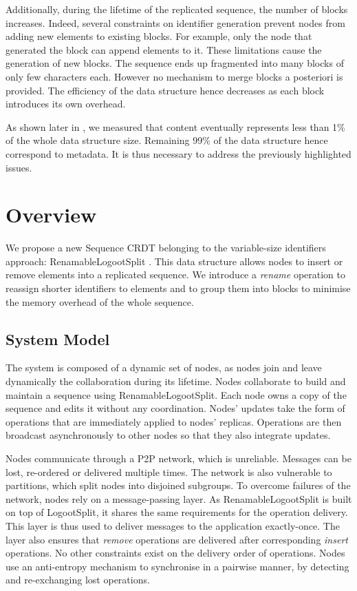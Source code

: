 \documentclass[10pt,journal,compsoc]{IEEEtran}
\begin{document}
Additionally, during the lifetime of the replicated sequence, the number of blocks increases.
Indeed, several constraints on identifier generation prevent nodes from adding new elements to existing blocks.
For example, only the node that generated the block can append elements to it.
These limitations cause the generation of new blocks.
The sequence ends up fragmented into many blocks of only few characters each.
However no mechanism to merge blocks a posteriori is provided.
The efficiency of the data structure hence decreases as each block introduces its own overhead.

As shown later in , we measured that content eventually represents less than 1\% of the whole data structure size.
Remaining 99\% of the data structure hence correspond to metadata.
It is thus necessary to address the previously highlighted issues.

\section{Overview}
\label{sec:overview}

We propose a new Sequence \ac{CRDT} belonging to the variable-size identifiers approach: RenamableLogootSplit \cite{nicolas:hal-01932552,nicolas:hal-02526724}.
This data structure allows nodes to insert or remove elements into a replicated sequence.
We introduce a \emph{rename} operation to reassign shorter identifiers to elements and to group them into blocks to minimise the memory overhead of the whole sequence.

\subsection{System Model}

The system is composed of a dynamic set of nodes, as nodes join and leave dynamically the collaboration during its lifetime.
Nodes collaborate to build and maintain a sequence using RenamableLogootSplit.
Each node owns a copy of the sequence and edits it without any coordination.
Nodes' updates take the form of operations that are immediately applied to nodes' replicas.
Operations are then broadcast asynchronously to other nodes so that they also integrate updates.

Nodes communicate through a \ac{P2P} network, which is unreliable.
Messages can be lost, re-ordered or delivered multiple times.
The network is also vulnerable to partitions, which split nodes into disjoined subgroups.
To overcome failures of the network, nodes rely on a message-passing layer.
As RenamableLogootSplit is built on top of LogootSplit, it shares the same requirements for the operation delivery.
This layer is thus used to deliver messages to the application exactly-once.
The layer also ensures that \emph{remove} operations are delivered after corresponding \emph{insert} operations.
No other constraints exist on the delivery order of operations.
Nodes use an anti-entropy mechanism \cite{10.1109/TSE.1983.236733} to synchronise in a pairwise manner, by detecting and re-exchanging lost operations.
\end{document}
